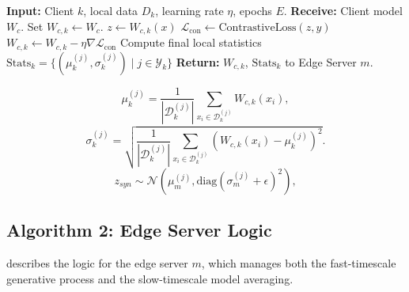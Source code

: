 \begin{algorithm}[!ht]
    \caption{H-SFP: Client-Side Training}
    \label{alg:client}
    \begin{algorithmic}[1]
    \State \textbf{Input:} Client $k$, local data $D_k$, learning rate $\eta$, epochs $E$.
    \State \textbf{Receive:} Client model $W_c$.
    \State Set $W_{c,k} \leftarrow W_c$.
            \State $z \leftarrow W_{c,k}(x)$ 
            \State $\mathcal{L}_{\text{con}} \leftarrow \text{ContrastiveLoss}(z, y)$ 
            \State $W_{c,k} \leftarrow W_{c,k} - \eta \nabla \mathcal{L}_{\text{con}}$
        \EndFor
    \EndFor
    \State Compute final local statistics $\text{Stats}_k = \{(\mu_k^{(j)}, \sigma_k^{(j)}) \mid j \in \mathcal{Y}_k\}$
    \State \textbf{Return:} $W_{c,k}$, $\text{Stats}_k$ to Edge Server $m$.
    \end{algorithmic}
\end{algorithm}


\begin{equation}
    \mu_k^{(j)} = \frac{1}{|\mathcal{D}_k^{(j)}|} \sum_{x_i \in \mathcal{D}_k^{(j)}} W_{c,k}(x_i),
    \label{mean_client}
\end{equation}
\begin{equation}
    \sigma_k^{(j)} = \sqrt{\frac{1}{|\mathcal{D}_k^{(j)}|} \sum_{x_i \in \mathcal{D}_k^{(j)}} (W_{c,k}(x_i) - \mu_k^{(j)})^2}.
    \label{std_client}
\end{equation}
\begin{equation}
    \label{eq:synthesis}
    z_{syn} \sim \mathcal{N}(\mu_m^{(j)}, \text{diag}(\sigma_m^{(j)} + \epsilon)^2),
\end{equation}
\subsection*{Algorithm 2: Edge Server Logic}

 describes the logic for the edge server $m$, which manages both the fast-timescale generative process and the slow-timescale model averaging.

